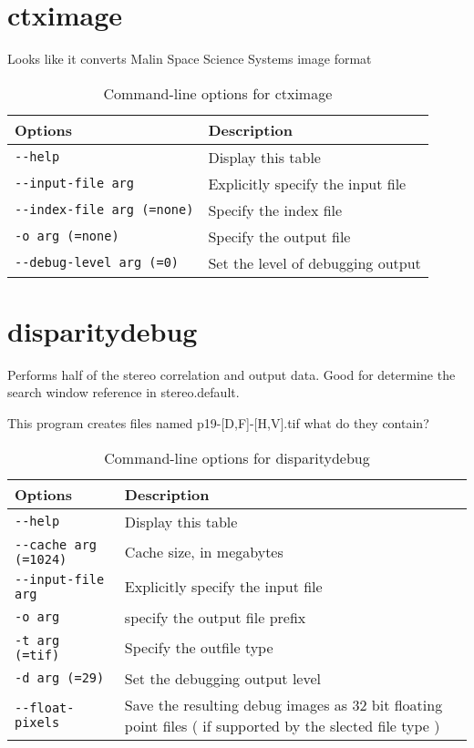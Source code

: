 \section{ctximage}
\label{ctximage}

Looks like it converts Malin Space Science Systems image format

\begin{longtable}{|l|p{10cm}|}
\caption{Command-line options for ctximage}
\label{tbl:ctximage}
\endfirsthead
\endhead
\endfoot
\endlastfoot
\hline
Options & Description \\ \hline \hline
\verb#--help# & Display this table \\ \hline
\verb#--input-file arg# & Explicitly specify the input file \\ \hline
\verb#--index-file arg (=none)# & Specify the index file \\ \hline
\verb#-o arg (=none)# & Specify the output file \\ \hline
\verb#--debug-level arg (=0)# & Set the level of debugging output \\ \hline
\end{longtable}

\section{disparitydebug}
\label{disparitydebug}

Performs half of the stereo correlation and output data. Good for
determine the search window reference in stereo.default.

This program creates files named p19-[D,F]-[H,V].tif what do they contain?

\begin{longtable}{|l|p{10cm}|}
\caption{Command-line options for disparitydebug}
\label{tbl:disparitydebug}
\endfirsthead
\endhead
\endfoot
\endlastfoot
\hline
Options & Description \\ \hline \hline
\verb#--help# & Display this table \\ \hline
\verb#--cache arg (=1024)# & Cache size, in megabytes \\ \hline
\verb#--input-file arg# & Explicitly specify the input file \\ \hline
\verb#-o arg# & specify the output file prefix \\ \hline
\verb#-t arg (=tif)# & Specify the outfile type \\ \hline
\verb#-d arg (=29)# & Set the debugging output level \\ \hline
\verb#--float-pixels# & Save the resulting debug images as 32 bit floating point files ( if supported by the slected file type ) \\ \hline
\end{longtable}


